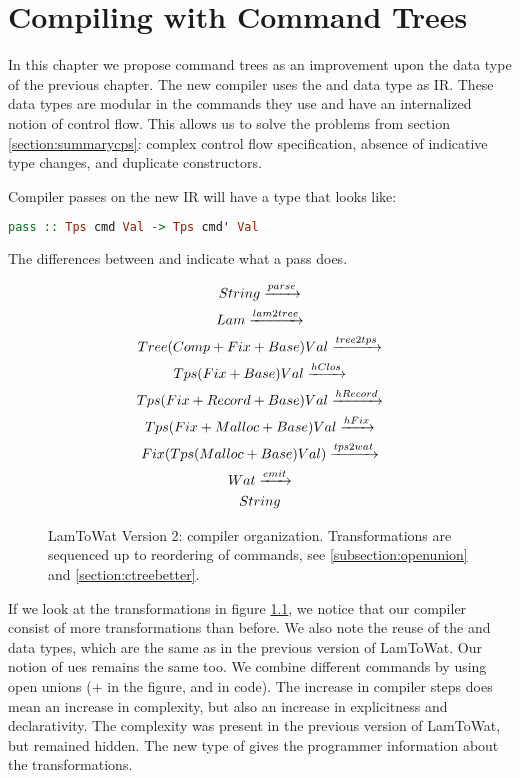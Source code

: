 
\chapter{\label{chap:treecomp}Compiling with Command Trees}
In this chapter we propose command trees as an improvement upon the  data type of the previous chapter. The new compiler uses the  and  data type as IR. These data types are modular in the commands they use and have an internalized notion of control flow. This allows us to solve the problems from section \ref{section:summarycps}: complex control flow specification, absence of indicative type changes, and duplicate constructors.

Compiler passes on the new IR will have a type that looks like:

\begin{lstlisting}[language=Haskell]
pass :: Tps cmd Val -> Tps cmd' Val
\end{lstlisting}

The differences between  and  indicate what a pass does.

\begin{figure}
\begin{gather*}
  String \xrightarrow{parse}\\
  Lam \xrightarrow{lam2tree}\\
  Tree  (Comp + Fix + Base) Val \xrightarrow{tree2tps}\\
  Tps          (Fix + Base) Val \xrightarrow{hClos}\\
  Tps (Fix + Record + Base) Val \xrightarrow{hRecord}\\
  Tps (Fix + Malloc + Base) Val \xrightarrow{hFix}\\
  Fix (Tps (Malloc + Base) Val) \xrightarrow{tps2wat}\\
  Wat \xrightarrow{emit}\\
  String
\end{gather*}
\caption{LamToWat Version 2: compiler organization. Transformations are sequenced up to reordering of commands, see \ref{subsection:openunion} and \ref{section:ctreebetter}.}
\label{fig:lam2watv2org}
\end{figure}

If we look at the transformations in figure \ref{fig:lam2watv2org}, we notice that our compiler consist of more transformations than before. We also note the reuse of the  and  data types, which are the same as in the previous version of LamToWat. Our notion of ues remains the same too. We combine different commands by using open unions ($+$ in the figure, and \icode{:+:} in code). The increase in compiler steps does mean an increase in complexity, but also an increase in explicitness and declarativity. The complexity was present in the previous version of LamToWat, but remained hidden. The new type of  gives the programmer information about the transformations. 


